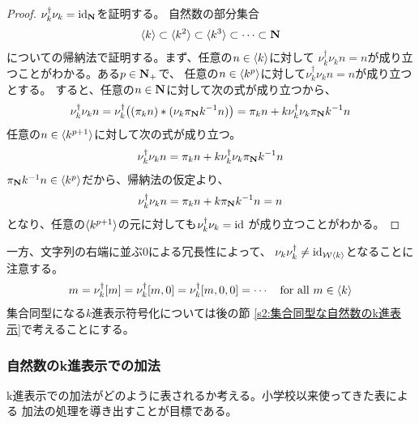 	\begin{proof} $\nu_k^\dag\nu_k={\operatorname{id}}_{\mathbf{N}}$を証明する。
	自然数の部分集合
	\begin{equation*}\begin{split}
		\mathinner{\langle{k}\rangle}\subset\mathinner{\langle{k^2}\rangle}\subset\mathinner{\langle{k^3}\rangle}\subset\cdots\subset\mathbf{N}
	\end{split}\end{equation*}
	についての帰納法で証明する。まず、任意の$n\in\mathinner{\langle{k}\rangle}$に対して
	$\nu_k^\dag\nu_kn=n$が成り立つことがわかる。ある$p\in\mathbf{N}_+$で、
	任意の$n\in\mathinner{\langle{k^p}\rangle}$に対して$\nu_k^\dag\nu_kn=n$が成り立つとする。
	すると、任意の$n\in\mathbf{N}$に対して次の式が成り立つから、
	\begin{equation*}\begin{split}
		\nu_k^\dag\nu_kn 
		= \nu_k^\dag\bigl((\pi_kn) * (\nu_k\pi_{\mathbf{N}} k^{-1}n)\bigr)
		= \pi_kn + k\nu_k^\dag\nu_k\pi_{\mathbf{N}} k^{-1}n
	\end{split}\end{equation*}
	任意の$n\in\mathinner{\langle{k^{p+1}}\rangle}$に対して次の式が成り立つ。
	\begin{equation*}\begin{split}
		\nu_k^\dag\nu_kn = \pi_kn + k\nu_k^\dag\nu_k\pi_{\mathbf{N}} k^{-1}n
	\end{split}\end{equation*}
	$\pi_{\mathbf{N}} k^{-1}n\in\mathinner{\langle{k^{p}}\rangle}$だから、帰納法の仮定より、
	\begin{equation*}\begin{split}
		\nu_k^\dag\nu_kn = \pi_kn + k\pi_{\mathbf{N}} k^{-1}n = n
	\end{split}\end{equation*}
	となり、任意の$\mathinner{\langle{k^{p+1}}\rangle}$の元に対しても$\nu_k^\dag\nu_k={\operatorname{id}}$
	が成り立つことがわかる。
	\end{proof}

	一方、文字列の右端に並ぶ$0$による冗長性によって、
	$\nu_k\nu_k^\dag\neq{\ensuremath{\operatorname{id}}}_{{{\mathcal{W}}}\mathinner{\langle{k}\rangle}}$となることに注意する。
	\begin{equation*}\begin{split}
		m = \nu_k^\dag[m] = \nu_k^\dag[m,0] = \nu_k^\dag[m,0,0] = \cdots
		\quad\text{for all }m\in\mathinner{\langle{k}\rangle}
	\end{split}\end{equation*}
	集合同型になる$k$進表示符号化については後の節
	\ref{s2:集合同型な自然数のk進表示}で考えることにする。

\subsubsection{自然数のk進表示での加法}\label{s3:自然数のk進表示での加法} %
	k進表示での加法がどのように表されるか考える。小学校以来使ってきた表による
	加法の処理を導き出すことが目標である。

